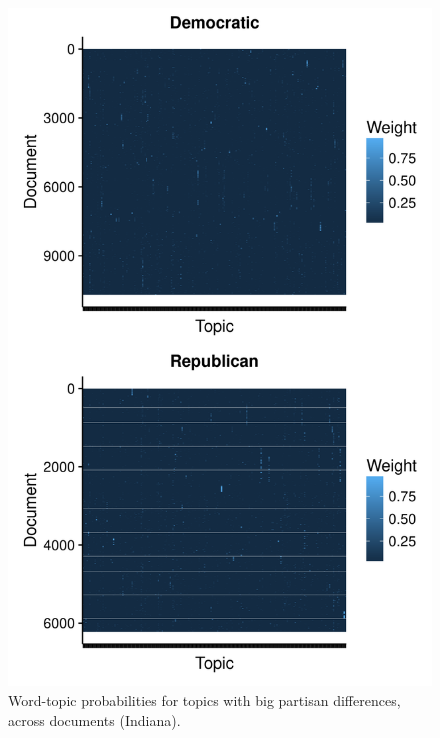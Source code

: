\documentclass[11pt]{article}
\begin{document}
\begin{figure}[htp]
	\centering %
	\caption{Word-topic probabilities for topics with big partisan differences, across documents (Indiana).}
	\label{heatmaps_weights}
	\includegraphics[width=0.8\linewidth]{figures/heatmaps_weights_IN.png}
\end{figure}
\end{document}
